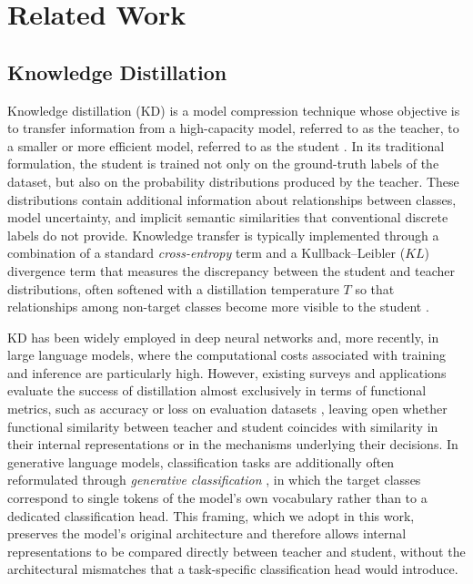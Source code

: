 \documentclass[conference]{IEEEtran}
\begin{document}
\section{Related Work}\label{sec:related-work}

\subsection{Knowledge Distillation}

Knowledge distillation (KD) is a model compression technique whose objective is to transfer information from a high-capacity model, referred to as the teacher, to a smaller or more efficient model, referred to as the student \cite{hinton2015distilling}. In its traditional formulation, the student is trained not only on the ground-truth labels of the dataset, but also on the probability distributions produced by the teacher. These distributions contain additional information about relationships between classes, model uncertainty, and implicit semantic similarities that conventional discrete labels do not provide. Knowledge transfer is typically implemented through a combination of a standard \textit{cross-entropy} term and a Kullback--Leibler ($KL$) divergence term that measures the discrepancy between the student and teacher distributions, often softened with a distillation temperature $T$ so that relationships among non-target classes become more visible to the student \cite{hinton2015distilling}.

KD has been widely employed in deep neural networks and, more recently, in large language models, where the computational costs associated with training and inference are particularly high. However, existing surveys and applications evaluate the success of distillation almost exclusively in terms of functional metrics, such as accuracy or loss on evaluation datasets \cite{gou2021knowledge}, leaving open whether functional similarity between teacher and student coincides with similarity in their internal representations or in the mechanisms underlying their decisions. In generative language models, classification tasks are additionally often reformulated through \textit{generative classification} \cite{daillm}, in which the target classes correspond to single tokens of the model's own vocabulary rather than to a dedicated classification head. This framing, which we adopt in this work, preserves the model's original architecture and therefore allows internal representations to be compared directly between teacher and student, without the architectural mismatches that a task-specific classification head would introduce.
\end{document}
